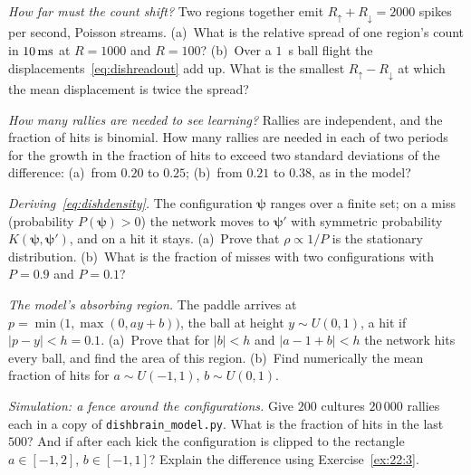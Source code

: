 \begin{exercise}[\lvlA]
\label{ex:22:1}
\emph{How far must the count shift?} Two regions together emit $R_\uparrow+R_\downarrow=2000$ spikes per second, Poisson streams. (a)~What is the relative spread of one region's count in $10\,\text{ms}$ at $R=1000$ and $R=100$? (b)~Over a $1$~s ball flight the displacements~\eqref{eq:dishreadout} add up. What is the smallest $R_\uparrow-R_\downarrow$ at which the mean displacement is twice the spread?
\end{exercise}

\begin{exercise}[\lvlA]
\label{ex:22:2}
\emph{How many rallies are needed to see learning?} Rallies are independent, and the fraction of hits is binomial. How many rallies are needed in each of two periods for the growth in the fraction of hits to exceed two standard deviations of the difference: (a)~from $0.20$ to $0.25$; (b)~from $0.21$ to $0.38$, as in the model?
\end{exercise}

\begin{exercise}[\lvlB]
\label{ex:22:3}
\emph{Deriving~\eqref{eq:dishdensity}.} The configuration $\boldsymbol\psi$ ranges over a finite set; on a miss (probability $P(\boldsymbol\psi)>0$) the network moves to $\boldsymbol\psi'$ with symmetric probability $K(\boldsymbol\psi,\boldsymbol\psi')$, and on a hit it stays. (a)~Prove that $\rho\propto1/P$ is the stationary distribution. (b)~What is the fraction of misses with two configurations with $P=0.9$ and $P=0.1$?
\end{exercise}

\begin{exercise}[\lvlB]
\label{ex:22:4}
\emph{The model's absorbing region.} The paddle arrives at $p=\min\bigl(1,\max(0,ay+b)\bigr)$, the ball at height $y\sim U(0,1)$, a hit if $|p-y|<h=0.1$. (a)~Prove that for $|b|<h$ and $|a-1+b|<h$ the network hits every ball, and find the area of this region. (b)~Find numerically the mean fraction of hits for $a\sim U(-1,1)$, $b\sim U(0,1)$.
\end{exercise}

\begin{exercise}[\lvlB]
\label{ex:22:5}
\emph{Simulation: a fence around the configurations.} Give $200$ cultures $20\,000$ rallies each in a copy of \texttt{dishbrain\_model.py}. What is the fraction of hits in the last $500$? And if after each kick the configuration is clipped to the rectangle $a\in[-1,2]$, $b\in[-1,1]$? Explain the difference using Exercise~\ref{ex:22:3}.
\end{exercise}

